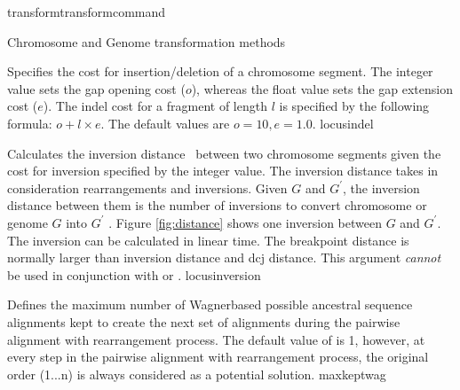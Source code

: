\begin{command}{transform}{transformcommand}
\begin{arguments}
\begin{argumentgroup}{Chromosome and Genome transformation methods}
\begin{description}
                    {Specifies the cost for insertion/deletion of a
                    chromosome segment. The integer value sets the gap opening
                    cost ($o$), whereas the float value sets the gap extension
                    cost ($e$).  The indel cost for a fragment of length $l$ is
                    specified by the following formula:
                        $o + l \times e$. The default values are $o=10, e=1.0$.}
                    {locusindel}
                        
                    {Calculates the inversion distance~\cite{hanenhalliandpevzner1995}
                    between two chromosome segments given the cost for inversion
                    specified by the integer value. The inversion distance
                    takes in consideration rearrangements and
                    inversions. Given $G$ and $G^\prime$, the inversion distance between
                    them is the number of inversions to convert chromosome or genome $G$ 
                    into $G^\prime$ \cite{hanenhalliandpevzner1995}. Figure \ref{fig:distance} shows one inversion  
                    between $G$ and $G^\prime$. The inversion can be calculated in linear time.
                    The breakpoint distance is normally larger than
                    inversion distance  and dcj distance.
                    This argument \emph{cannot} be used in conjunction with
                     or .} 
                    {locusinversion}  

                    {Defines the maximum number of Wagner\-based possible ancestral sequence
                    alignments kept to create the next set of alignments during the pairwise alignment
                    with rearrangement process.  The default value of  is 1,
                    however, at every step in the pairwise alignment with rearrangement process, the original
                    order (1...n) is always considered as a potential solution.}
                    {maxkeptwag}
       		      

\end{description}
\end{argumentgroup}
\end{arguments}
\end{command}
